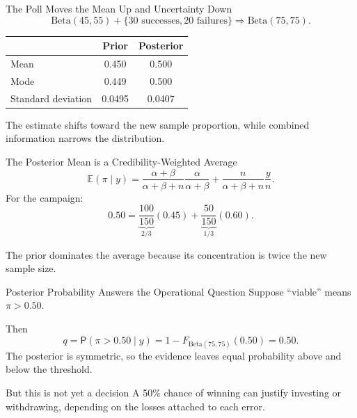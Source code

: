 \documentclass[aspectratio=43,11pt]{beamer}
\newcommand{\prob}{\mathsf{P}}
\newcommand{\E}{\mathbb{E}}
\begin{document}
{
  \begin{frame}{The Poll Moves the Mean Up and Uncertainty Down}
    \[
    \mathrm{Beta}(45,55)+\{30\text{ successes},20\text{ failures}\}
    \Rightarrow\mathrm{Beta}(75,75).
    \]
    \begin{center}
      \begin{tabular}{lcc}
        \toprule
        & Prior & Posterior\\
        \midrule
        Mean & 0.450 & 0.500\\
        Mode & 0.449 & 0.500\\
        Standard deviation & 0.0495 & 0.0407\\
        \bottomrule
      \end{tabular}
    \end{center}
    \vspace{0.7em}
    The estimate shifts toward the new sample proportion, while combined information narrows the distribution.
  \end{frame}

  \begin{frame}{The Posterior Mean is a Credibility-Weighted Average}
    \[
    \E(\pi\mid y)
    =\frac{\alpha+\beta}{\alpha+\beta+n}\frac{\alpha}{\alpha+\beta}
    +\frac{n}{\alpha+\beta+n}\frac{y}{n}.
    \]
    For the campaign:
    \[
    0.50=\underbrace{\frac{100}{150}}_{2/3}(0.45)
    +\underbrace{\frac{50}{150}}_{1/3}(0.60).
    \]
    \begin{block}{}
      The prior dominates the average because its concentration is twice the new sample size.
    \end{block}
  \end{frame}

  \begin{frame}{Posterior Probability Answers the Operational Question}
    Suppose ``viable'' means $\pi>0.50$.

    Then
    \[
    q=\prob(\pi>0.50\mid y)
    =1-F_{\mathrm{Beta}(75,75)}(0.50)=0.50.
    \]
    The posterior is symmetric, so the evidence leaves equal probability above and below the threshold.
    \begin{block}{But this is not yet a decision}
      A 50\% chance of winning can justify investing or withdrawing, depending on the losses attached to each error.
    \end{block}
  \end{frame}

}
\end{document}
